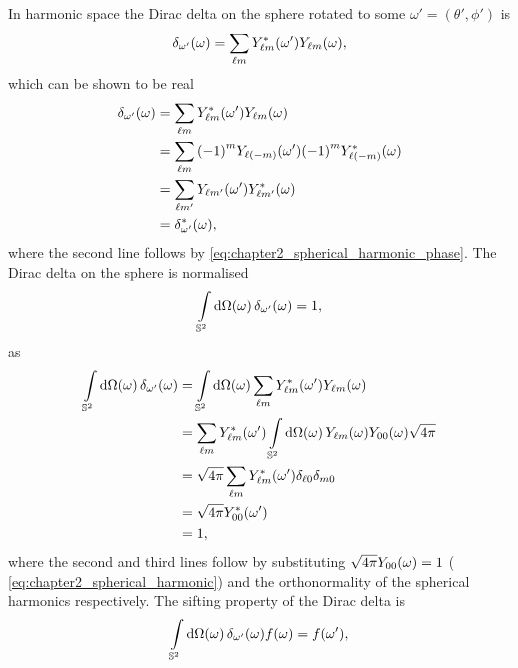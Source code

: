 In harmonic space the Dirac delta on the sphere rotated to some \(\omega'=(\theta',\phi')\) is
%
\begin{equation}
	\pixel{\delta_{\omega'}}
	= \harmonicSum \pixel[']{\conj{\harmonic{Y}}} \pixel{\harmonic{Y}},
\end{equation}
%
which can be shown to be real
%
\begin{align}\label{eq:chapter3_dirac_delta_real}
	\pixel{\delta_{\omega'}}
	 & = \harmonicSum \pixel[']{\conj{\harmonic{Y}}} \pixel{\harmonic{Y}} \nonumber{}                           \\
	 & = \harmonicSum \phaseFactor \pixel[']{Y_{\ell(-m)}} \phaseFactor \pixel{\conj{Y_{\ell(-m)}}} \nonumber{} \\
	 & = \sum\limits_{\ell m'} \pixel[']{Y_{\ell m'}} \pixel{\conj{Y_{\ell m'}}} \nonumber{}                    \\
	 & = \pixel{\conj{\delta_{\omega'}}},
\end{align}
%
where the second line follows by \cref{eq:chapter2_spherical_harmonic_phase}.
The Dirac delta on the sphere is normalised
%
\begin{equation}
	\integrateSphere{\omega} \pixel{\delta_{\omega'}}
	= 1,
\end{equation}
%
as
%
\begin{align}
	\integrateSphere{\omega} \pixel{\delta_{\omega'}}
	 & = \integrateSphere{\omega} \harmonicSum \pixel[']{\conj{\harmonic{Y}}} \pixel{\harmonic{Y}} \nonumber{}                            \\
	 & = \harmonicSum \pixel[']{\conj{\harmonic{Y}}} \integrateSphere{\omega} \pixel{\harmonic{Y}} \pixel{Y_{00}} \sqrt{4\pi} \nonumber{} \\
	 & = \sqrt{4\pi} \harmonicSum \pixel[']{\conj{\harmonic{Y}}} \delta_{\ell0} \delta_{m0} \nonumber{}                                   \\
	 & = \sqrt{4\pi} \pixel[']{\conj{Y_{00}}} \nonumber{}                                                                                 \\
	 & = 1,
\end{align}
%
where the second and third lines follow by substituting \(\sqrt{4\pi}\pixel{Y_{00}}=1\) (\cf{} \cref{eq:chapter2_spherical_harmonic}) and the orthonormality of the spherical harmonics respectively.
The sifting property of the Dirac delta is
%
\begin{equation}
	\integrateSphere{\omega} \pixel{\delta_{\omega'}} \pixel{f}
	= \pixel[']{f},
\end{equation}
